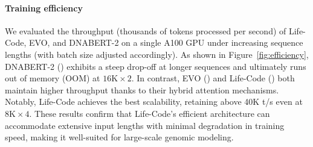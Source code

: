 \paragraph{Training efficiency}
We evaluated the throughput (thousands of tokens processed per second) of Life-Code, EVO, and DNABERT-2 on a single A100 GPU under increasing sequence lengths (with batch size adjusted accordingly). As shown in Figure~\ref{fig:efficiency}, DNABERT-2 () exhibits a steep drop-off at longer sequences and ultimately runs out of memory (OOM) at \(16\text{K}\times2\). In contrast, EVO () and Life-Code () both maintain higher throughput thanks to their hybrid attention mechanisms. Notably, Life-Code achieves the best scalability, retaining above 40K t/s even at \(8\text{K}\times4\). These results confirm that Life-Code’s efficient architecture can accommodate extensive input lengths with minimal degradation in training speed, making it well-suited for large-scale genomic modeling.



